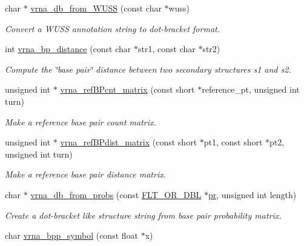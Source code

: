 \begin{DoxyCompactItemize}
char $\ast$ \mbox{\hyperlink{group__struct__utils_ga02ca70cffb2d864f7b2d95d92218bae0}{vrna\+\_\+db\+\_\+from\+\_\+\+W\+U\+SS}} (const char $\ast$wuss)
\begin{DoxyCompactList}\small\item\em Convert a W\+U\+SS annotation string to dot-\/bracket format. \end{DoxyCompactList}\item 
int \mbox{\hyperlink{group__struct__utils_ga65bdfbac6a16bf30286e8a3f7d15f60a}{vrna\+\_\+bp\+\_\+distance}} (const char $\ast$str1, const char $\ast$str2)
\begin{DoxyCompactList}\small\item\em Compute the \char`\"{}base pair\char`\"{} distance between two secondary structures s1 and s2. \end{DoxyCompactList}\item 
unsigned int $\ast$ \mbox{\hyperlink{group__struct__utils_gab4c2a00c99ce1d612ffa5bde114eb96d}{vrna\+\_\+ref\+B\+Pcnt\+\_\+matrix}} (const short $\ast$reference\+\_\+pt, unsigned int turn)
\begin{DoxyCompactList}\small\item\em Make a reference base pair count matrix. \end{DoxyCompactList}\item 
unsigned int $\ast$ \mbox{\hyperlink{group__struct__utils_ga5a27bd058183170afd4716f5b8ff511a}{vrna\+\_\+ref\+B\+Pdist\+\_\+matrix}} (const short $\ast$pt1, const short $\ast$pt2, unsigned int turn)
\begin{DoxyCompactList}\small\item\em Make a reference base pair distance matrix. \end{DoxyCompactList}\item 
char $\ast$ \mbox{\hyperlink{group__struct__utils_ga0c28c410a5ab22d6ab9c77a84e8d5b44}{vrna\+\_\+db\+\_\+from\+\_\+probs}} (const \mbox{\hyperlink{group__data__structures_ga31125aeace516926bf7f251f759b6126}{F\+L\+T\+\_\+\+O\+R\+\_\+\+D\+BL}} $\ast$\mbox{\hyperlink{fold__vars_8h_ac98ec419070aee6831b44e5c700f090f}{pr}}, unsigned int length)
\begin{DoxyCompactList}\small\item\em Create a dot-\/bracket like structure string from base pair probability matrix. \end{DoxyCompactList}\item 
char \mbox{\hyperlink{group__struct__utils_ga025bff1b27fa46534c8fae6980f64bb5}{vrna\+\_\+bpp\+\_\+symbol}} (const float $\ast$x)

\end{DoxyCompactItemize}
